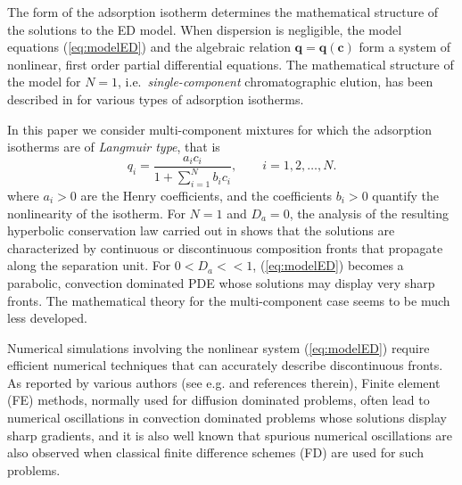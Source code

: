 \documentclass[preprint]{elsarticle}
\theoremstyle{definition}
\newcommand{\bc}{\boldsymbol c}
\newcommand{\bq}{\boldsymbol q}
\begin{document}
The form of the adsorption isotherm determines the mathematical
structure of the solutions to the ED model.  When dispersion is negligible, 
the model equations (\ref{eq:modelED}) and the algebraic relation
$\bq=\bq(\bc)$ form a system of nonlinear, first order partial differential
equations. The mathematical structure of the model for $N=1$,
i.e.~{\em single-component} chromatographic elution, has been
described in \cite{Mazzotti2013} for various types of adsorption
isotherms.  

In this paper we consider multi-component mixtures for which the
adsorption isotherms are of {\em  
  Langmuir type}, that is
\begin{equation} \label{eq:q-def}
q_i = \frac{a_i c_i}{1+\sum_{i=1}^N b_i c_i}, \qquad i=1,2,\dots,N.
\end{equation}
where $a_i>0$ are the Henry coefficients,  and the coefficients $b_i>0$
quantify the 
nonlinearity of the isotherm. For $N=1$ and $D_a=0$, the analysis of
the resulting hyperbolic conservation law carried out in
\cite{Mazzotti2013} shows that   the solutions are  
characterized by continuous or 
discontinuous composition fronts that propagate along the separation
unit. For $0<D_a<<1$, (\ref{eq:modelED}) becomes a parabolic,
convection dominated PDE
 whose solutions  may display very sharp fronts. The mathematical
 theory for the multi-component case seems to be much less developed.

 Numerical simulations 
involving the nonlinear 
system (\ref{eq:modelED}) require efficient numerical
techniques that can accurately describe discontinuous fronts. As
reported by various authors (see e.g. \cite{Javeed} and references
therein),  Finite 
element (FE) methods, normally used for diffusion dominated
problems, often lead to numerical  oscillations in convection dominated
problems whose solutions  display sharp gradients, and it is also well known
that spurious numerical
oscillations are  also observed when
classical finite difference schemes (FD) are used for such
problems. 
\end{document}
